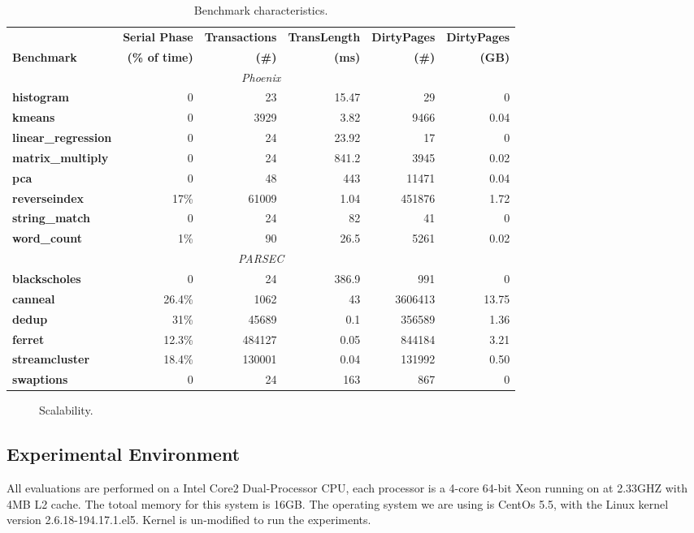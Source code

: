\begin{table*}[!t]
\centering
\begin{tabular}{|l|rrrrr|}
\hline
& {\bf \small Serial Phase} & {\bf \small Transactions} & {\bf \small TransLength} & {\bf \small DirtyPages} & {\bf \small DirtyPages}
\\
{\bf \small Benchmark} & {\bf \small (\% of time)} & {\bf (\#)} & {\bf \small (ms)} & {\bf \small (\#)} & {\bf \small (GB)}\\
\hline
\multicolumn{6}{|c|}{\emph{Phoenix}} \\
\hline
\small \textbf{histogram} & 0 & 23 & 15.47 & 29 & 0 \\
\small \textbf{kmeans} & 0 & 3929 & 3.82 & 9466 & 0.04\\
\small \textbf{linear\_regression} & 0 & 24 & 23.92 & 17 & 0\\
\small \textbf{matrix\_multiply} & 0 & 24 & 841.2 & 3945 & 0.02\\
\small \textbf{pca} & 0 & 48 & 443 & 11471 & 0.04 \\
\small \textbf{reverseindex} & 17\% & 61009 & 1.04 & 451876 & 1.72\\
\small \textbf{string\_match} & 0 & 24 & 82 & 41 & 0 \\
\small \textbf{word\_count} & 1\% & 90 & 26.5 & 5261 & 0.02\\
\hline
\multicolumn{6}{|c|}{\emph{PARSEC}} \\
\hline
\small \textbf{blackscholes} & 0 & 24 & 386.9 & 991 & 0\\
\small \textbf{canneal} & 26.4\% & 1062 & 43 & 3606413 & 13.75\\
\small \textbf{dedup} & 31\% & 45689 & 0.1 & 356589 & 1.36\\
\small \textbf{ferret} & 12.3\% & 484127 & 0.05 & 844184 & 3.21 \\
\small \textbf{streamcluster} & 18.4\% & 130001 & 0.04 & 131992 & 0.50\\
\small \textbf{swaptions} & 0 & 24 & 163 & 867 & 0\\
\hline
\end{tabular}
\caption{Benchmark characteristics.\label{tbl:characteristics}}
\end{table*}


\begin{figure}[!t]
\caption{Scalability.\label{fig:scalability}}
\end{figure}

\subsection{Experimental Environment}
All evaluations are performed on a Intel Core2 Dual-Processor CPU, each
processor is a 4-core 64-bit Xeon running on at 2.33GHZ with 4MB L2 cache. 
The totoal memory for this system is 16GB. The operating system we are using
is CentOs 5.5, with the Linux kernel version 2.6.18-194.17.1.el5. 
Kernel is un-modified to run the experiments.

